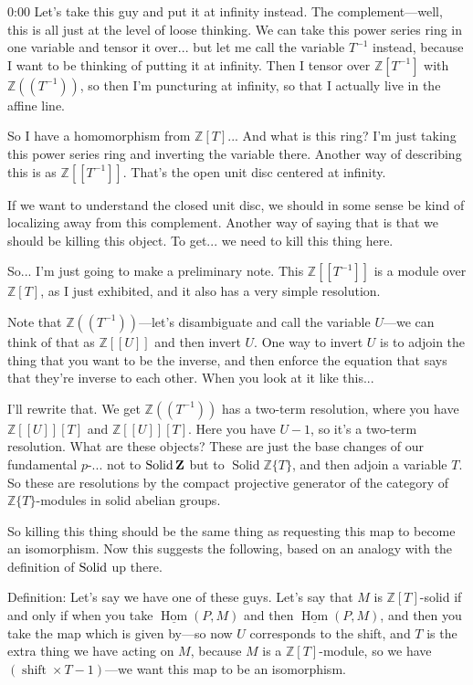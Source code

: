 \begin{unfinished}{0:00}
Let's take this guy and put it at infinity instead. The complement---well, this is all just at the level of loose thinking. We can take this power series ring in one variable and tensor it over... but let me call the variable $T^{-1}$ instead, because I want to be thinking of putting it at infinity. Then I tensor over $\mathbb{Z}[T^{-1}]$ with $\mathbb{Z}((T^{-1}))$, so then I'm puncturing at infinity, so that I actually live in the affine line.

So I have a homomorphism from $\mathbb{Z}[T]$... And what is this ring? I'm just taking this power series ring and inverting the variable there. Another way of describing this is as $\mathbb{Z}[[T^{-1}]]$. That's the open unit disc centered at infinity.

If we want to understand the closed unit disc, we should in some sense be kind of localizing away from this complement. Another way of saying that is that we should be killing this object. To get... we need to kill this thing here.

So... I'm just going to make a preliminary note. This $\mathbb{Z}[[T^{-1}]]$ is a module over $\mathbb{Z}[T]$, as I just exhibited, and it also has a very simple resolution.

Note that $\mathbb{Z}((T^{-1}))$---let's disambiguate and call the variable $U$---we can think of that as $\mathbb{Z}[[U]]$ and then invert $U$. One way to invert $U$ is to adjoin the thing that you want to be the inverse, and then enforce the equation that says that they're inverse to each other. When you look at it like this...

I'll rewrite that. We get $\mathbb{Z}((T^{-1}))$ has a two-term resolution, where you have $\mathbb{Z}[[U]][T]$ and $\mathbb{Z}[[U]][T]$. Here you have $U-1$, so it's a two-term resolution. What are these objects? These are just the base changes of our fundamental $p$-... not to $\operatorname{Solid} \mathbf Z$ but to $\operatorname{Solid} \mathbb{Z} \{T\}$, and then adjoin a variable $T$. So these are resolutions by the compact projective generator of the category of $\mathbb{Z}\{T\}$-modules in solid abelian groups.

So killing this thing should be the same thing as requesting this map to become an isomorphism. Now this suggests the following, based on an analogy with the definition of $\mathrm{Solid}$ up there.

Definition: Let's say we have one of these guys. Let's say that $M$ is $\mathbb{Z}[T]$-solid if and only if when you take $\underline{\operatorname{Hom}}(P, M)$ and then $\underline{\operatorname{Hom}}(P, M)$, and then you take the map which is given by---so now $U$ corresponds to the shift, and $T$ is the extra thing we have acting on $M$, because $M$ is a $\mathbb{Z}[T]$-module, so we have $(\operatorname{shift} \times T - 1)$---we want this map to be an isomorphism.


\end{unfinished}
